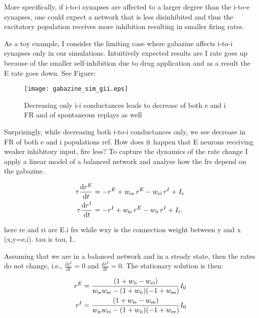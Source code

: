     More specifically, if i-to-i synapses are affected to a larger
    degree than the i-to-e synapses, one could expect a network that is less
    disinhibited and thus the excitatory population receives more inhibition
    resulting in smaller firing rates. 

    As a toy example, I consider the limiting case where gabazine affects
    i-to-i synapses only in our simulations.  Intuitively expected results are
    I rate goes up because of the smaller self-inhibition due to drug
    application and as a result the E rate goes down. See Figure:

    \begin{figure}
      \texttt{[image: gabazine\_sim\_gii.eps]}
      \caption{Decreasing only i-i conductances leads to decrease of both e and
                i FR and of spontaneous replays as well}
      \label{fig:gabazine_sim_giionly}
    \end{figure}
    
    Surprisingly, while decreasing both i-to-i conductances only, we see
    decrease in FR of both e and i populations ref. How does it happen that E
    neurons receiving weaker inhibitory input, fire less? To capture the
    dynamics of the rate change I apply a linear model of a balanced network
    and analyse how the frs depend on the gabazine.

    \begin{equation}
      \begin{split}
        \tau \frac{\text{d}r^E}{\text{d}t} &= - r^E + w_{\rm ee} \, r^E -w_{\rm ei} \, r^I + I_e\\
        \tau \frac{\text{d}r^I}{\text{d}t} &= - r^I + w_{\rm ie} \, r^E -w_{\rm ii} \, r^I + I_i . \\
      \end{split}
      \label{eq:balanced_net}
    \end{equation}

    here re and ri are E.i frs while wxy is the connection weight between y and x (x,y=e,i). tau is tau, I..

    Assuming that we are in a balanced network and in a steady state, then the
    rates do not change, i.e., $ \frac{\text{d}r^I}{\text{d}t} = 0$ and
    $\frac{\text{d}r^I}{\text{d}t} = 0 $.  The stationary solution is then:

    \begin{equation}
      \begin{split}
        r^E &= \frac{(1+w_{\rm ii} - w_{\rm ei})}{w_{\rm ie}w_{\rm ei} - (1+w_{\rm ii})(-1+w_{\rm ee})} I_0 \\
        r^I &= \frac{(1+w_{\rm ie} - w_{\rm ee})}{w_{\rm ie}w_{\rm ei} - (1+w_{\rm ii})(-1+w_{\rm ee})} I_0
      \end{split}
      \label{eq:balanced_sol}
    \end{equation}
  
